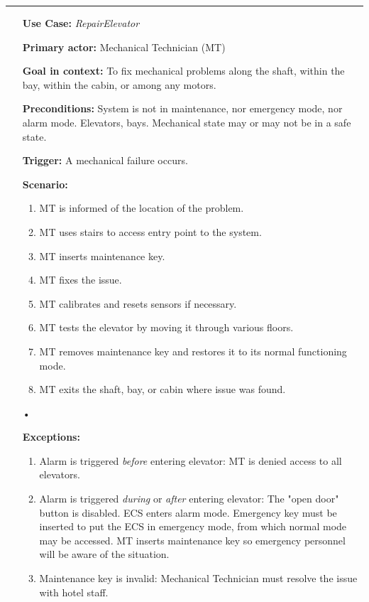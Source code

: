 \documentclass[12pt]{article}
\begin{document}
	\par\noindent\rule{\textwidth}{0.4pt}
		\begin{itemize} %
			\item[] \textbf{Use Case:} \textit{RepairElevator}
			\item[] \textbf{Primary actor:} Mechanical Technician (MT)
			\item[] \textbf{Goal in context:} To fix mechanical problems along the shaft, within the bay, within the cabin, or among any
			motors.
			\item[] \textbf{Preconditions:} System is not in maintenance, nor emergency mode, nor alarm mode. 
			Elevators, bays. Mechanical state may or may not be in a safe state.
			\item[] \textbf{Trigger:} A mechanical failure occurs.
			\item[] { \textbf{Scenario:}
		        \begin{enumerate}
		        	\item MT is informed of the location of the problem.
		        	\item MT uses stairs to access entry point to the system.
		        	\item MT inserts maintenance key.
		        	\item MT fixes the issue.
		        	\item MT calibrates and resets sensors if necessary.
		        	\item MT tests the elevator by moving it through various floors.
		        	\item MT removes maintenance key and restores it to its normal functioning mode.
		        	\item MT exits the shaft, bay, or cabin where issue was found.
		        \end{enumerate}}
			\item[•]{\textbf{Exceptions:} 
			    \begin{enumerate}
		        	\item Alarm is triggered \textit{before} entering elevator: MT is denied access to all elevators.
		        	\item Alarm is triggered \textit{during} or \textit{after} entering elevator: The "open door" button is disabled.
		        	ECS enters alarm mode. Emergency key must be inserted to put the ECS in emergency mode, from which normal mode may
		        	be accessed. MT inserts maintenance key so emergency personnel will be aware of the situation.
		        	\item Maintenance key is invalid: Mechanical Technician must resolve the issue with hotel staff.

\end{enumerate}}
\end{itemize}
\end{document}
